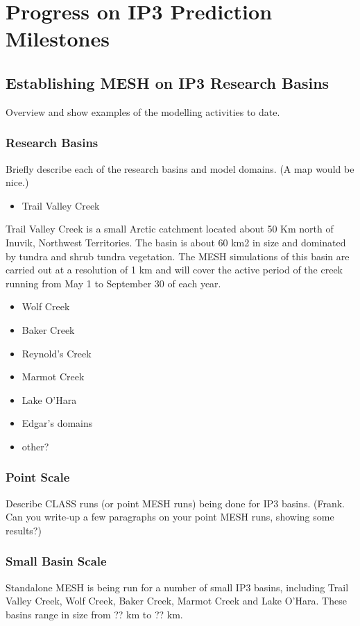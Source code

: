 \documentclass[hess]{copernicus}
\begin{document}
\section{Progress on IP3 Prediction Milestones}

\subsection{Establishing MESH on IP3 Research Basins}
Overview and show examples of the modelling activities to date.

\subsubsection{Research Basins}
Briefly describe each of the research basins and model domains. (A map would be nice.)

\begin{itemize}
	\item Trail Valley Creek
\end{itemize}

Trail Valley Creek is a small Arctic catchment located about 50 Km north of Inuvik, Northwest Territories. The basin is about 60 km2 in size and dominated by tundra and shrub tundra vegetation. The MESH simulations of this basin are carried out at a resolution of 1 km and will cover the active period of the creek running from May 1 to September 30 of each year. 

\begin{itemize}
	\item Wolf Creek
	\item Baker Creek
	\item Reynold's Creek
	\item Marmot Creek
	\item Lake O'Hara
	\item Edgar's domains
	\item other?
\end{itemize}

\subsubsection{Point Scale}
Describe CLASS runs (or point MESH runs) being done for IP3 basins. (Frank. Can you write-up a few paragraphs on your point MESH runs, showing some results?)

\subsubsection{Small Basin Scale}
Standalone MESH is being run for a number of small IP3 basins, including Trail Valley Creek, Wolf Creek, Baker Creek, Marmot Creek and Lake O'Hara. These basins range in size from ?? km to ?? km.
\end{document}
